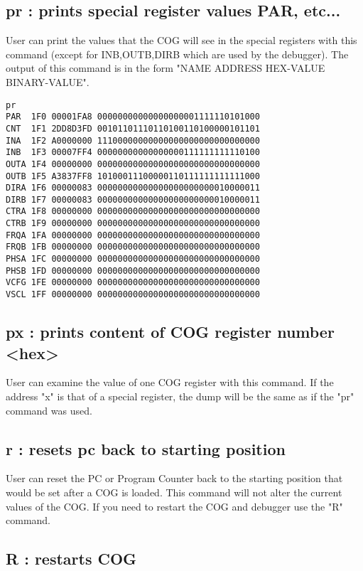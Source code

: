 \documentclass{article}
\numberwithin{equation}{section} %
\begin{document}
\subsection{pr     : prints special register values PAR, etc...}

User can print the values that the COG will see in the special registers with this
command (except for INB,OUTB,DIRB which are used by the debugger). The output of
this command is in the form  "NAME ADDRESS HEX-VALUE BINARY-VALUE".

\begin{lstlisting}
pr
PAR  1F0 00001FA8 00000000000000000001111110101000
CNT  1F1 2DD8D3FD 00101101110110100110100000101101
INA  1F2 A0000000 11100000000000000000000000000000
INB  1F3 00007FF4 00000000000000000111111111110100
OUTA 1F4 00000000 00000000000000000000000000000000
OUTB 1F5 A3837FF8 10100011100000110111111111111000
DIRA 1F6 00000083 00000000000000000000000010000011
DIRB 1F7 00000083 00000000000000000000000010000011
CTRA 1F8 00000000 00000000000000000000000000000000
CTRB 1F9 00000000 00000000000000000000000000000000
FRQA 1FA 00000000 00000000000000000000000000000000
FRQB 1FB 00000000 00000000000000000000000000000000
PHSA 1FC 00000000 00000000000000000000000000000000
PHSB 1FD 00000000 00000000000000000000000000000000
VCFG 1FE 00000000 00000000000000000000000000000000
VSCL 1FF 00000000 00000000000000000000000000000000
\end{lstlisting}

\subsection{px     : prints content of COG register number <hex>}

User can examine the value of one COG register with this command. If the address "x"
is that of a special register, the dump will be the same as if the "pr" command was used.


\subsection{r      : resets pc back to starting position}

User can reset the PC or Program Counter back to the starting position that would be
set after a COG is loaded. This command will not alter the current values of the COG.
If you need to restart the COG and debugger use the "R" command.


\subsection{R      : restarts COG}
\end{document}
